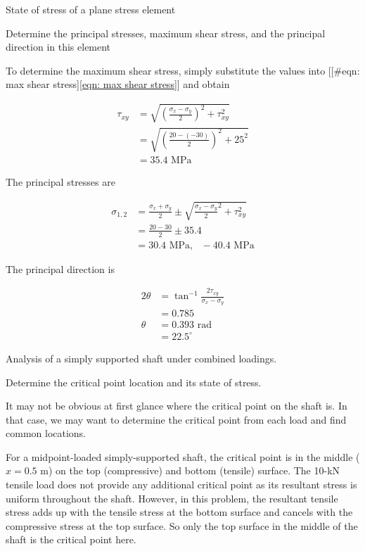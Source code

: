 \documentclass[a4paper,openany,12pt]{book}
\begin{document}
State of stress of a plane stress element

Determine the principal stresses, maximum shear stress, and the
principal direction in this element


To determine the maximum shear stress, simply substitute the values into
[[\#eqn: max shear stress]\ref{eqn: max shear stress}] and obtain

$$\begin{aligned}
      \tau_{xy} &= \sqrt {\left( \frac{\sigma_x - \sigma_y}{2} \right)^2 + \tau _{xy}^2}  \\ 
      &= \sqrt {\left( \frac{20 - ( - 30)}{2} \right)^2 + 25^2}  \\ 
      &= 35.4\text{ MPa}
    \end{aligned}$$

The principal stresses are

$$\begin{aligned}
      \sigma_{1,2} &= \frac{\sigma_x + \sigma_y}{2} \pm \sqrt {\frac{\sigma_x - \sigma_y}{2}^2 + \tau _{xy}^2}  \\ 
      &= \frac{20 - 30}{2} \pm 35.4 \\ 
      &= 30.4\text{ MPa}, \text{ } - 40.4\text{ MPa}
    \end{aligned}$$

The principal direction is

$$\begin{aligned}
      2\theta & = \tan^{-1}\frac{2\tau_{xy}}{\sigma_x - \sigma_y} \\ 
      &= 0.785 \\ 
      \theta  &= 0.393\text{ rad} \\ 
      &= 22.5^{\circ}
    \end{aligned}$$

Analysis of a simply supported shaft under combined loadings.


Determine the critical point location and its state of stress.

It may not be obvious at first glance where the critical point on the
shaft is. In that case, we may want to determine the critical point from
each load and find common locations.

For a midpoint-loaded simply-supported shaft, the critical point is in
the middle (\(x = 0.5\) m) on the top (compressive) and bottom (tensile)
surface. The 10-kN tensile load does not provide any additional critical
point as its resultant stress is uniform throughout the shaft. However,
in this problem, the resultant tensile stress adds up with the tensile
stress at the bottom surface and cancels with the compressive stress at
the top surface. So only the top surface in the middle of the shaft is
the critical point here.
\end{document}
